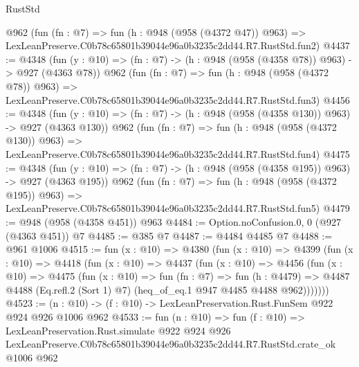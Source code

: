 \begin{lexlean}{RustStd}
\begin{coremodule}
    @962
    (fun (fn : @7) =>
    fun (h : @948 (@958 (@4372 @47)) @963) =>
    LexLeanPreserve.C0b78c65801b39044e96a0b3235c2dd44.R7.RustStd.fun2)
@4437 := @4348
    (fun (y : @10) => (fn : @7) -> (h : @948 (@958 (@4358 @78)) @963) -> @927 (@4363 @78))
    @962
    (fun (fn : @7) =>
    fun (h : @948 (@958 (@4372 @78)) @963) =>
    LexLeanPreserve.C0b78c65801b39044e96a0b3235c2dd44.R7.RustStd.fun3)
@4456 := @4348
    (fun (y : @10) => (fn : @7) -> (h : @948 (@958 (@4358 @130)) @963) -> @927 (@4363 @130))
    @962
    (fun (fn : @7) =>
    fun (h : @948 (@958 (@4372 @130)) @963) =>
    LexLeanPreserve.C0b78c65801b39044e96a0b3235c2dd44.R7.RustStd.fun4)
@4475 := @4348
    (fun (y : @10) => (fn : @7) -> (h : @948 (@958 (@4358 @195)) @963) -> @927 (@4363 @195))
    @962
    (fun (fn : @7) =>
    fun (h : @948 (@958 (@4372 @195)) @963) =>
    LexLeanPreserve.C0b78c65801b39044e96a0b3235c2dd44.R7.RustStd.fun5)
@4479 := @948 (@958 (@4358 @451)) @963
@4484 := Option.noConfusion.{0, 0} (@927 (@4363 @451)) @7
@4485 := @385 @7
@4487 := @4484 @4485 @7
@4488 := @961 @1006
@4515 := fun (x : @10) =>
  @4380
    (fun (x : @10) =>
    @4399
      (fun (x : @10) =>
      @4418
        (fun (x : @10) =>
        @4437
          (fun (x : @10) =>
          @4456
            (fun (x : @10) =>
            @4475
              (fun (x : @10) =>
              fun (fn : @7) =>
              fun (h : @4479) =>
              @4487 @4488 (Eq.refl.{2} (Sort 1) @7) (heq_of_eq.{1} @947 @4485 @4488 @962)))))))
@4523 := (n : @10) -> (f : @10) -> LexLeanPreservation.Rust.FunSem @922 @924 @926 @1006 @962
@4533 := fun (n : @10) =>
  fun (f : @10) =>
  LexLeanPreservation.Rust.simulate
    @922
    @924
    @926
    LexLeanPreserve.C0b78c65801b39044e96a0b3235c2dd44.R7.RustStd.crate_ok
    @1006
    @962
\end{coremodule}
\end{lexlean}
